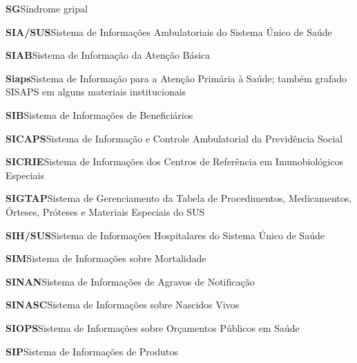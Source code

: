 \noindent\textbf{SG}\hspace{1em}Síndrome gripal\par\smallskip
\noindent\textbf{SIA/SUS}\hspace{1em}Sistema de Informações Ambulatoriais do Sistema Único de Saúde\par\smallskip
\noindent\textbf{SIAB}\hspace{1em}Sistema de Informação da Atenção Básica\par\smallskip
\noindent\textbf{Siaps}\hspace{1em}Sistema de Informação para a Atenção Primária à Saúde; também grafado SISAPS em alguns materiais institucionais\par\smallskip
\noindent\textbf{SIB}\hspace{1em}Sistema de Informações de Beneficiários\par\smallskip
\noindent\textbf{SICAPS}\hspace{1em}Sistema de Informação e Controle Ambulatorial da Previdência Social\par\smallskip
\noindent\textbf{SICRIE}\hspace{1em}Sistema de Informações dos Centros de Referência em Imunobiológicos Especiais\par\smallskip
\noindent\textbf{SIGTAP}\hspace{1em}Sistema de Gerenciamento da Tabela de Procedimentos, Medicamentos, Órteses, Próteses e Materiais Especiais do SUS\par\smallskip
\noindent\textbf{SIH/SUS}\hspace{1em}Sistema de Informações Hospitalares do Sistema Único de Saúde\par\smallskip
\noindent\textbf{SIM}\hspace{1em}Sistema de Informações sobre Mortalidade\par\smallskip
\noindent\textbf{SINAN}\hspace{1em}Sistema de Informações de Agravos de Notificação\par\smallskip
\noindent\textbf{SINASC}\hspace{1em}Sistema de Informações sobre Nascidos Vivos\par\smallskip
\noindent\textbf{SIOPS}\hspace{1em}Sistema de Informações sobre Orçamentos Públicos em Saúde\par\smallskip
\noindent\textbf{SIP}\hspace{1em}Sistema de Informações de Produtos\par\smallskip
